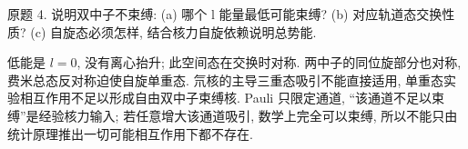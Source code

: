\begin{exercise}\label{ex:2202-6-4}
原题 4. 说明双中子不束缚: (a) 哪个 l 能量最低可能束缚? (b) 对应轨道态交换性质? (c) 自旋态必须怎样, 结合核力自旋依赖说明总势能.
\end{exercise}
\begin{solution}
低能是 $l=0$, 没有离心抬升; 此空间态在交换时对称. 两中子的同位旋部分也对称, 费米总态反对称迫使自旋单重态. 氘核的主导三重态吸引不能直接适用, 单重态实验相互作用不足以形成自由双中子束缚核. Pauli 只限定通道, ``该通道不足以束缚''是经验核力输入; 若任意增大该通道吸引, 数学上完全可以束缚, 所以不能只由统计原理推出一切可能相互作用下都不存在.
\end{solution}
